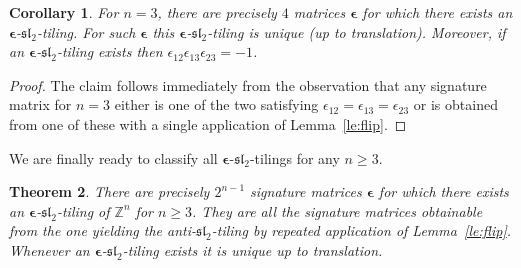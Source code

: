 \documentclass{amsart}
\newtheorem{theorem}{Theorem}
\newtheorem{corollary}[theorem]{Corollary}
\newcommand{\bepsilon}{\boldsymbol{\epsilon}}
\newcommand{\fsl}{\mathfrak{sl}}
\newcommand{\ZZ}{\mathbb{Z}}
\begin{document}
  \begin{corollary}\label{co:n=3}
    For $n=3$, there are precisely $4$ matrices $\bepsilon$ for which there exists an $\bepsilon$-$\fsl_2$-tiling. 
    For such $\bepsilon$ this $\bepsilon$-$\fsl_2$-tiling is unique (up to translation).
    Moreover, if an $\bepsilon$-$\fsl_2$-tiling exists then $\epsilon_{12}\epsilon_{13}\epsilon_{23}=-1$.
  \end{corollary}
  \begin{proof}
    The claim follows immediately from the observation that any signature matrix for $n=3$ either is one of the two satisfying $\epsilon_{12}=\epsilon_{13}=\epsilon_{23}$ or is obtained from one of these with a single application of Lemma~\ref{le:flip}.
  \end{proof}

  We are finally ready to classify all $\bepsilon$-$\fsl_2$-tilings for any $n\geq3$.
  \begin{theorem}
    There are precisely $2^{n-1}$ signature matrices $\bepsilon$ for which there exists an $\bepsilon$-$\fsl_2$-tiling of $\ZZ^n$ for $n\geq3$.
    They are all the signature matrices obtainable from the one yielding the anti-$\fsl_2$-tiling by repeated application of Lemma~\ref{le:flip}.
    Whenever an $\bepsilon$-$\fsl_2$-tiling exists it is unique up to translation.
  \end{theorem}
\end{document}

